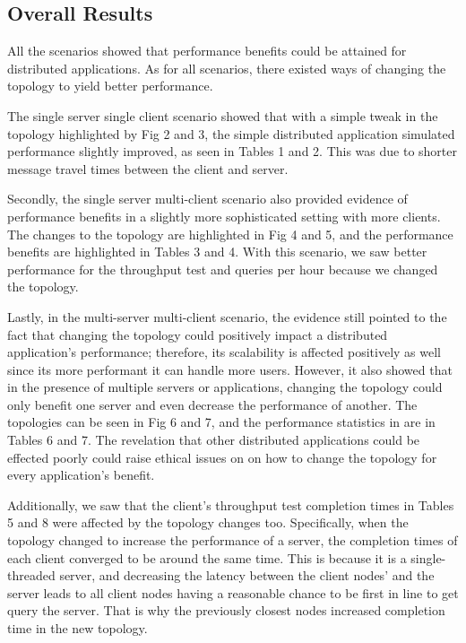 \subsection{Overall Results}

All the scenarios showed that performance benefits could be attained for distributed applications. As for all scenarios, there existed ways of changing the topology to yield better performance.

	The single server single client scenario showed that with a simple tweak in the topology highlighted by Fig 2 and 3, the simple distributed application simulated performance slightly improved, as seen in Tables 1 and 2. This was due to shorter message travel times between the client and server.

	Secondly, the single server multi-client scenario also provided evidence of performance benefits in a slightly more sophisticated setting with more clients. The changes to the topology are highlighted in Fig 4 and 5, and the performance benefits are highlighted in Tables 3 and 4. With this scenario, we saw better performance for the throughput test and queries per hour because we changed the topology.
	
	Lastly, in the multi-server multi-client scenario, the evidence still pointed to the fact that changing the topology could positively impact a distributed application's performance; therefore, its scalability is affected positively as well since its more performant it can handle more users. However, it also showed that in the presence of multiple servers or applications, changing the topology could only benefit one server and even decrease the performance of another. The topologies can be seen in Fig 6 and 7, and the performance statistics in are in Tables 6 and 7. The revelation that other distributed applications could be effected poorly could raise ethical issues on on how to change the topology for every application's benefit.

	Additionally, we saw that the client's throughput test completion times in Tables 5 and 8 were affected by the topology changes too. Specifically, when the topology changed to increase the performance of a server, the completion times of each client converged to be around the same time. This is because it is a single-threaded server, and decreasing the latency between the client nodes' and the server leads to all client nodes having a reasonable chance to be first in line to get query the server. That is why the previously closest nodes increased completion time in the new topology.

